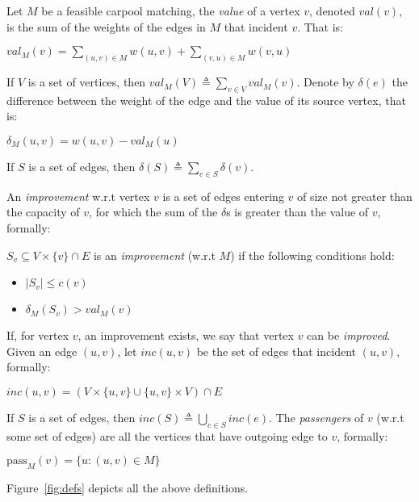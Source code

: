 
Let $M$ be a feasible carpool matching,
the \emph{value} of a vertex $v$, denoted $val(v)$, 
is the sum of the weights of the edges in $M$ that incident $v$. 
That is: 
%
\begin{definition}[$val$]
$val_M(v) = \sum_{(u, v) \in M} w(u, v) + \sum_{(v, u) \in M} w(v, u)$
\end{definition}
%
If $V$ is a set of vertices, then $val_M(V) \triangleq \sum_{v \in V} val_M(v)$.
%
Denote by $\delta(e)$ the difference between the weight of the edge and the value
of its source vertex,
that is:
%
\begin{definition}[$\delta$]
$\delta_M(u, v) = w(u, v) - val_M(u)$
\end{definition}
%
If $S$ is a set of edges, then $\delta(S) \triangleq \sum_{e \in S}\delta(v)$.

An \emph{improvement} w.r.t vertex $v$ 
is a set of edges entering $v$ of size not greater than the capacity of $v$, 
for which the sum of the $\delta$s is greater than the value of $v$,
formally: 

\begin{definition}[improvement]
$S_v \subseteq V \times \{v\} \cap E$ is an \emph{improvement} (w.r.t $M$)
if the following conditions hold:
\begin{itemize}
\item
$|S_v| \leq c(v)$
\item
$\delta_M(S_v) > val_M(v)$
\end{itemize}  
\end{definition}
%
If, for vertex $v$, an improvement exists, we say that vertex $v$ can be \emph{improved}.
%
Given an edge $(u,v)$, 
let $inc(u,v)$ be the set of edges that incident $(u, v)$,
formally:
%
\begin{definition}[inc]
$inc(u,v) = (V \times \{u, v\} \cup \{u, v\} \times V) \cap E$
\end{definition}
%
If $S$ is a set of edges, then $inc(S) \triangleq \bigcup_{e \in S} inc(e)$.
%
The \emph{passengers} of $v$ (w.r.t some set of edges) are all the vertices that have
outgoing edge to $v$, formally: 
%
\begin{definition}[passengers]
$\text{pass}_M(v) = \{u : (u, v) \in M\}$
\end{definition}
%
Figure~\ref{fig:defs} depicts all the above definitions.

